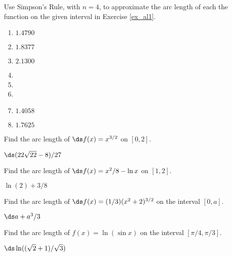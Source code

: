 \begin{enumialphparenastyle}
\begin{ex}
\end{ex}





\begin{ex}
Use Simpson's Rule, with $n=4$, to approximate the arc length of each the function on the given interval in Exercise \ref{ex_al1}. 

\begin{sol}
\begin{enumerate}
\item {$1.4790$}
\item {$1.8377$}
\item {$2.1300$}
\item 
\item 
\item 
\item {$1.4058$}
\item {$1.7625$}
\end{enumerate}
\end{sol}

\end{ex}







\begin{ex}
 Find the arc length of $\ds f(x)=x^{3/2}$ on $[0,2]$.
\begin{sol}
 $\ds (22\sqrt{22}-8)/27$
\end{sol}
\end{ex}

\begin{ex}
 Find the arc length of $\ds f(x) = x^2/8-\ln x$
on $[1,2]$.
\begin{sol}
 $\ln(2)+3/8$
\end{sol}
\end{ex}

\begin{ex}

Find the arc length of $\ds f(x) = (1/3)(x^2 +2)^{3/2}$
on the interval $[0,a]$.
\begin{sol}
 $\ds a+a^3/3$
\end{sol}
\end{ex}

\begin{ex}
 Find the arc length of $f(x)=\ln(\sin x)$ on the
interval $[\pi/4,\pi/3]$.
\begin{sol}
 $\ds \ln((\sqrt2+1)/\sqrt3)$
\end{sol}
\end{ex}


\end{enumialphparenastyle}
